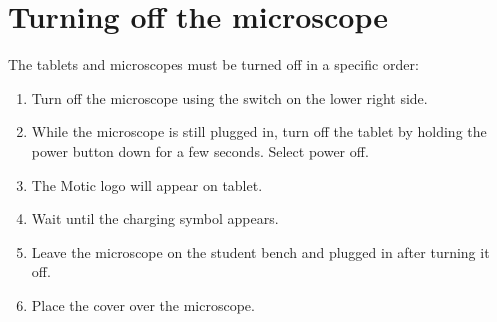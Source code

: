 \documentclass[]{book}
\providecommand{\tightlist}{%
  \setlength{\itemsep}{0pt}\setlength{\parskip}{0pt}}
\begin{document}
\hypertarget{turning-off-the-microscope}{%
\section{Turning off the microscope}\label{turning-off-the-microscope}}

The tablets and microscopes must be turned off in a specific order:

\begin{enumerate}
\def\labelenumi{\arabic{enumi}.}
\tightlist
\item
  Turn off the microscope using the switch on the lower right side.
\item
  While the microscope is still plugged in, turn off the tablet by holding the power button down for a few seconds. Select power off.
\item
  The Motic logo will appear on tablet.
\item
  Wait until the charging symbol appears.
\item
  Leave the microscope on the student bench and plugged in after turning it off.
\item
  Place the cover over the microscope.
\end{enumerate}
\end{document}
